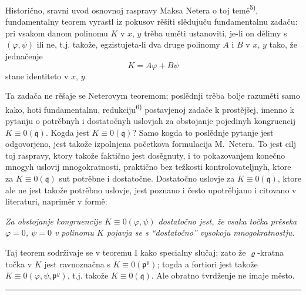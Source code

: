 \documentclass[11pt]{article}
\theoremstyle{plain}
\begin{document}
Historično, sravni uvod osnovnoj raspravy Maksa Netera o toj
temě\textsuperscript{5)}, fundamentalny teorem vyrastl iz pokusov
rěšiti slědujuču fundamentalnu zadaču: pri vsakom danom polinomu
$K$ v $x$, $y$ trěba uměti ustanoviti, je-li on dělimy s
$(\varphi, \psi)$ ili ne, t.j. takože, egzistujeta-li dva druge
polinomy $A$ i $B$ v $x$, $y$ tako, že jednačenje
\[
K = A\varphi + B\psi
\]
stane identiteto v $x$, $y$.

Ta zadača ne rěšaje se Neterovym teoremom; poslědnji trěba bolje
razuměti samo kako, hoti fundamentalnu, redukciju\textsuperscript{6)}
postavjenoj zadače k prostějšej, imenno k pytanju o potrěbnyh i
dostatočnyh uslovjah za obstojanje pojedinyh kongruencij
$K \equiv 0(\mathfrak{q})$. Kogda jest $K \equiv 0(\mathfrak{q})$?
Samo kogda to poslědnje pytanje jest odgovorjeno, jest takože
izpolnjena početkova formulacija M.\ Netera. To jest cilj toj
raspravy, ktory takože faktično jest dosěgnuty, i to pokazovanjem
konečno mnogyh uslovij mnogokratnosti, praktično bez težkosti
kontrolovateljnyh, ktore za $K \equiv 0(\mathfrak{q})$ sut
potrěbne i dostatočne. Dostatočno uslovje za
$K \equiv 0(\mathfrak{q})$, ktore ale ne jest takože potrěbno
uslovje, jest poznano i često upotrěbjano i citovano v literaturi,
napriměr v formě:

\smallskip
\textit{Za obstojanje kongruencije $K \equiv 0(\varphi, \psi)$
dostatočno jest, že vsaka točka prěseka $\varphi = 0$, $\psi = 0$
v polinomu $K$ pojavja se s ``dostatočno'' vysokoju mnogokratnostju.}

\smallskip
Taj teorem sodrživaje se v teoremu I kako specialny slučaj; zato že
$\varrho$-kratna točka v $K$ jest ravnoznačna s
$K \equiv 0(\mathfrak{p}^{\varrho})$; togda a fortiori jest takože
$K \equiv 0(\varphi, \psi, \mathfrak{p}^{\varrho})$, t.j. takože
$K \equiv 0(\mathfrak{q})$. Ale obratno tvrdženje ne imaje město.

\vspace{0.5em}
\noindent\rule{\textwidth}{0.4pt}
\vspace{0.3em}
\end{document}
